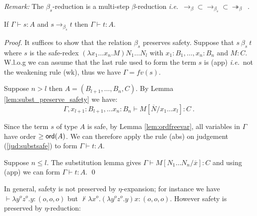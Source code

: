 \documentclass{llncs}
\newcommand\betared{\rightarrow_\beta}
\newcommand\betasred{\rightarrow_{\beta_s}}
\newcommand\betaredtr{\twoheadrightarrow_\beta} %
\newcommand\subst[2]{\left[ #1/#2 \right]}
\newcommand\ord[1]{{\sf
    ord}(#1)} \newcommand\typear{\rightarrow}
\begin{document}
\noindent \emph{Remark:} The $\beta_s$-reduction is a multi-step
$\beta$-reduction {\it i.e.}~$\betared \subset \betasred \subset
\betaredtr$\ .


\begin{lemma}
\label{lem:safered_preserve_safety}
If $\Gamma \vdash s :A$ and $s \betasred t$ then $\Gamma \vdash t :A$.
\end{lemma}

\begin{proof}
  It suffices to show that the relation $\beta_s$ preserves safety.
Suppose that $s\ \beta_s\ t$ where $s$ is the 
safe-redex $(\lambda x_1 \ldots x_n . M) N_1
  \ldots N_l $ with $x_1 : B_1, \ldots, x_n: B_n$
and $M:C$.  W.l.o.g we can assume that the last rule   used to form the term $s$ is {\sf(app)} {\it i.e.}~not the weakening rule {\sf(wk)}, thus  we have $\Gamma = fv(s)$.

Suppose $n>l$ then $A = (B_{l+1}, \ldots, B_n, C)$. By Lemma \ref{lem:subst_preserve_safety} we have:
\begin{equation}
\Gamma, x_{l+1}:B_{l+1}, \ldots x_n :B_{n}\vdash M\subst{\overline{N}}{x_1 \ldots x_l} : C \label{jud:substsafe}\ .
\end{equation}

Since the term $s$ of type $A$ is safe, by Lemma \ref{lem:ordfreevar}, all variables in $\Gamma$ have order $\geq \ord{A}$. We can therefore apply the rule {\sf(abs)} on judgement (\ref{jud:substsafe}) to form $\Gamma \vdash t :A$.

Suppose $n \leq l$. The substitution lemma gives
$\Gamma \vdash M\subst{N_1 \ldots N_n}{\overline{x}} : C$ and using {\sf(app)} we can form $\Gamma \vdash t :A$.
  \qed
\end{proof}

In general, safety is not preserved by $\eta$-expansion; for instance we have
$\vdash \lambda y^o z^o . y : (o,o,o)$ but
$\not \vdash \lambda x^o . (\lambda y^o z^o . y) x : (o,o,o)$.
However safety is preserved by $\eta$-reduction:
\end{document}
